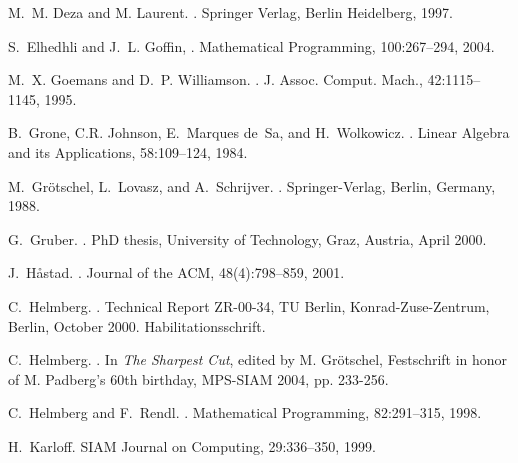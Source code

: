\documentclass[12pt]{article}
\begin{document}
\begin{thebibliography}{10}
M.~M. Deza and M. Laurent.
.
\newblock Springer Verlag, Berlin Heidelberg, 1997.

S.~Elhedhli and J.~L. Goffin,
.
\newblock Mathematical Programming, 100:267--294, 2004.

M.~X. Goemans and D.~P. Williamson.
.
\newblock J. Assoc. Comput. Mach., 42:1115--1145, 1995.

B.~Grone, C.R. Johnson, E.~Marques de~Sa, and H.~Wolkowicz.
.
\newblock Linear Algebra and its Applications, 58:109--124, 1984.

M.~Gr{\"{o}}tschel, L.~Lovasz, and A.~Schrijver.
.
\newblock Springer-Verlag, Berlin, Germany, 1988.

G.~Gruber.
.
\newblock PhD thesis, University of Technology, Graz, Austria, April 2000.

J.~H\r{a}stad.
.
\newblock Journal of the ACM, 48(4):798--859, 2001.

C.~Helmberg.
.
\newblock Technical Report ZR-00-34, TU Berlin, Konrad-Zuse-Zentrum, Berlin,
  October 2000.
\newblock Habilitationsschrift.

C.~Helmberg.
.
\newblock In {\em The Sharpest Cut}, edited by M. Gr\"{o}tschel, Festschrift in
  honor of M. Padberg's 60th birthday, MPS-SIAM 2004, pp. 233-256.

C.~Helmberg and F.~Rendl.
.
\newblock Mathematical Programming, 82:291--315, 1998.

H.~Karloff.
\newblock SIAM Journal on Computing, 29:336--350, 1999.


\end{thebibliography}
\end{document}
